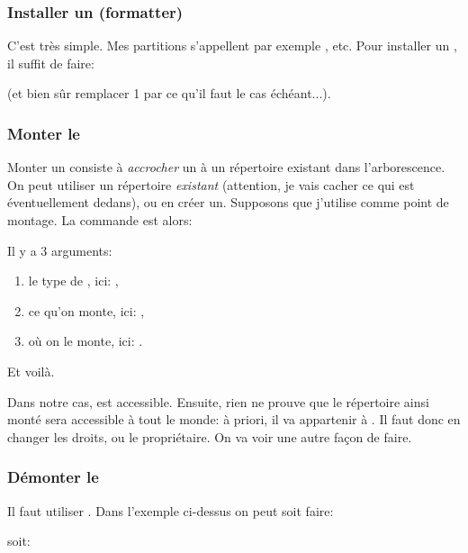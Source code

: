 \subsubsection{Installer un  \sff{} (formatter)}
C'est très simple. Mes partitions s'appellent par exemple
,  etc. Pour installer un \sff{}
  , il suffit de faire:

   (et bien sûr remplacer 1 par ce qu'il
  faut le cas échéant...).

\subsubsection{Monter le \sff{}}


Monter un \sff{} consiste à \emph{accrocher} un \sff{} à un
répertoire existant 
dans l'arborescence. On peut utiliser un répertoire \emph{existant}
(attention, je vais cacher ce qui est éventuellement dedans), ou en
créer un. Supposons que j'utilise  comme point de
montage. La commande est alors: 


Il y a 3 arguments:
\begin{enumerate}
\item le type de \sff, ici: ,
\item ce qu'on monte, ici: ,
\item où on le monte, ici:  .
\end{enumerate}
Et voilà.

Dans notre cas,  est accessible. Ensuite, rien ne prouve que
le répertoire ainsi monté sera accessible à tout le monde: à priori, il
va appartenir à . Il faut donc en changer les droits, ou le
propriétaire. On va
voir une autre façon de faire.

\subsubsection{Démonter le \sff}
Il faut utiliser . Dans l'exemple ci-dessus on peut soit
faire:


soit:


